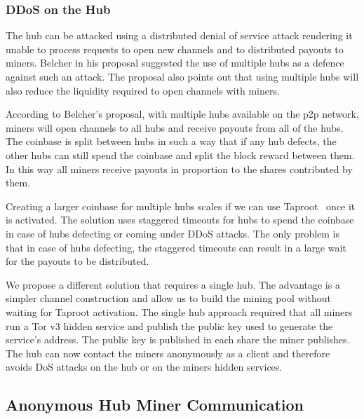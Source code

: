 \documentclass{article}
\begin{document}

\subsubsection{DDoS on the Hub}\label{ref:ddos-attack}

The hub can be attacked using a distributed denial of service attack
rendering it unable to process requests to open new channels and to
distributed payouts to miners. Belcher in his proposal suggested the
use of multiple hubs as a defence against such an attack. The proposal
also points out that using multiple hubs will also reduce the
liquidity required to open channels with miners.

According to Belcher's proposal, with multiple hubs available on the
p2p network, miners will open channels to all hubs and receive payouts
from all of the hubs. The coinbase is split between hubs in such a way
that if any hub defects, the other hubs can still spend the coinbase
and split the block reward between them. In this way all miners
receive payouts in proportion to the shares contributed by them.

Creating a larger coinbase for multiple hubs scales if we can use
Taproot~\cite{bip340,bip341, bip342} once it is activated. The
solution uses staggered timeouts for hubs to spend the coinbase in
case of hubs defecting or coming under DDoS attacks. The only problem
is that in case of hubs defecting, the staggered timeouts can result
in a large wait for the payouts to be distributed.

We propose a different solution that requires a single hub. The
advantage is a simpler channel construction and allow us to build the
mining pool without waiting for Taproot activation. The single hub
approach required that all miners run a Tor v3 hidden service and
publish the public key used to generate the service's address. The
public key is published in each share the miner publishes. The hub can
now contact the miners anonymously as a client and therefore avoids
DoS attacks on the hub or on the miners hidden services.

\subsection{Anonymous Hub Miner
  Communication}\label{sec:hub-miner-communication}
\end{document}
